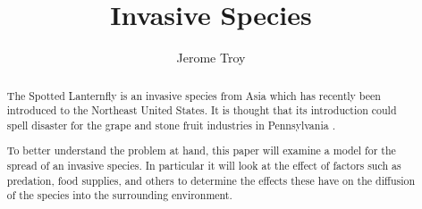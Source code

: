 \documentclass[12pt]{article}
\title{Invasive Species}
\author{Jerome Troy}
\begin{document}
\maketitle 

\begin{abstract}
    
    The Spotted Lanternfly is an invasive species from Asia which has recently been introduced to the Northeast United States.  It is thought that its introduction could spell disaster for the grape and stone fruit industries in Pennsylvania \cite{news-flies}.  
    
    To better understand the problem at hand, this paper will examine a model for the spread of an invasive species.  In particular it will look at the effect of factors such as predation, food supplies, and others to determine the effects these have on the diffusion of the species into the surrounding environment.

\end{abstract}





\end{document}
